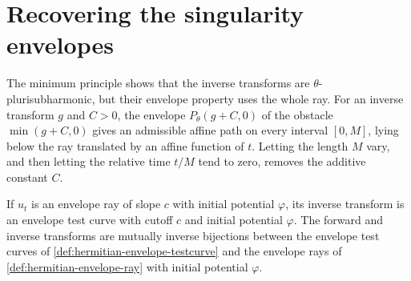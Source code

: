 \section{Recovering the singularity envelopes}

The minimum principle shows that the inverse transforms are $\theta$-plurisubharmonic, but their envelope property uses the whole ray. For an inverse transform $g$ and $C>0$, the envelope $P_\theta(g+C,0)$ of the obstacle $\min(g+C,0)$ gives an admissible affine path on every interval $[0,M]$, lying below the ray translated by an affine function of $t$. Letting the length $M$ vary, and then letting the relative time $t/M$ tend to zero, removes the additive constant $C$.

\begin{theorem}\label{thm:envelope-ray-to-testcurve}
If $u_t$ is an envelope ray of slope $c$ with initial potential $\varphi$, its inverse transform is an envelope test curve with cutoff $c$ and initial potential $\varphi$. The forward and inverse transforms are mutually inverse bijections between the envelope test curves of \cref{def:hermitian-envelope-testcurve} and the envelope rays of \cref{def:hermitian-envelope-ray} with initial potential $\varphi$.
\end{theorem}
